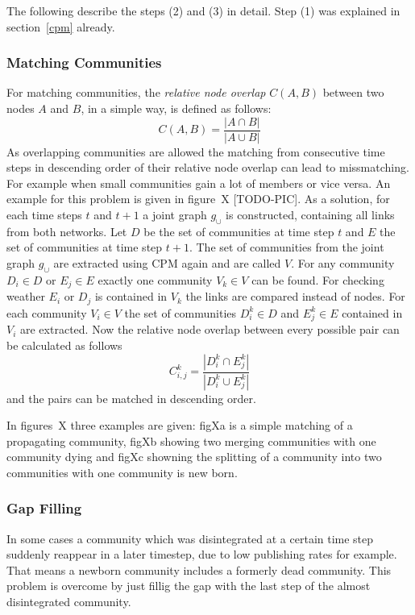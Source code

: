 \documentclass[runningheads,a4paper]{llncs}
\begin{document}
The following describe the steps (2) and (3) in detail.
Step (1) was explained in section~\ref{cpm} already.

\subsubsection{Matching Communities}
\label{evolution-algo-matching}
For matching communities, the \emph{relative node overlap} $C(A,B)$ between two nodes $A$ and $B$, in a simple way, is defined as follows:
$$C(A,B) = \frac{ \left| A \cap B\right| }{\left| A \cup B\right|}$$
As overlapping communities are allowed the matching from consecutive time steps in descending order of their relative node overlap can lead to missmatching.
For example when small communities gain a lot of members or vice versa. An example for this problem is given in figure~X [TODO-PIC].
As a solution, for each time steps $t$ and $t+1$ a joint graph $g_{\cup}$ is constructed, containing all links from both networks.
Let $D$ be the set of communities at time step $t$ and $E$ the set of communities at time step $t+1$. The set of communities from the joint graph $g_{\cup}$ are extracted using CPM again and are called $V$.
For any community $D_i \in D$ or $E_j \in E$ exactly one community $V_k \in V$ can be found.
For checking weather $E_i$ or $D_j$ is contained in $V_k$ the links are compared instead of nodes.
For each community $V_i \in V$ the set of communities $D_i^k \in D$ and $E_j^k \in E$ contained in $V_i$ are extracted.
Now the relative node overlap between every possible pair can be calculated as follows
$$C^k_{i,j} = \frac{\left| D_i^k \cap E_j^k\right|}{\left| D_i^k\cup E_j^k \right| }$$
and the pairs can be matched in descending order.

In figures~X three examples are given: figXa is a simple matching of a propagating community, figXb showing two merging communities with one community dying and figXc showning the splitting of a community into two communities with one community is new born.

\subsubsection{Gap Filling}
In some cases a community which was disintegrated at a certain time step suddenly reappear in a later timestep, due to low publishing rates for example.
That means a newborn community includes a formerly dead community.
This problem is overcome by just fillig the gap with the last step of the almost disintegrated community.
\end{document}
